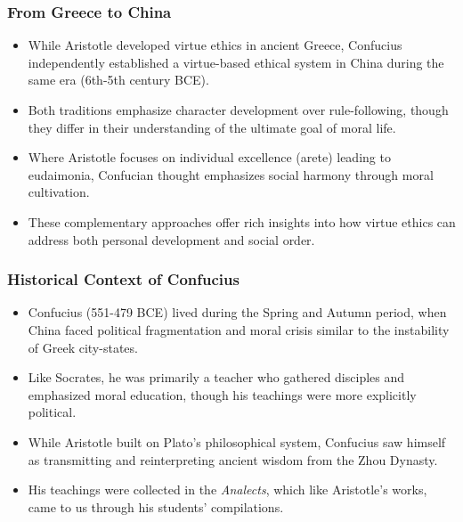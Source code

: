 \documentclass{beamer}
\begin{document}
\begin{frame}
    \frametitle{From Greece to China}
    \begin{itemize}
        \item While Aristotle developed virtue ethics in ancient Greece, Confucius independently established a virtue-based ethical system in China during the same era (6th-5th century BCE).
        
        \item Both traditions emphasize character development over rule-following, though they differ in their understanding of the ultimate goal of moral life.
        
        \item Where Aristotle focuses on individual excellence (arete) leading to eudaimonia, Confucian thought emphasizes social harmony through moral cultivation.
        
        \item These complementary approaches offer rich insights into how virtue ethics can address both personal development and social order.
    \end{itemize}
\end{frame}

\begin{frame}
    \frametitle{Historical Context of Confucius}
    \begin{itemize}
        \item Confucius (551-479 BCE) lived during the Spring and Autumn period, when China faced political fragmentation and moral crisis similar to the instability of Greek city-states.
        
        \item Like Socrates, he was primarily a teacher who gathered disciples and emphasized moral education, though his teachings were more explicitly political.
        
        \item While Aristotle built on Plato's philosophical system, Confucius saw himself as transmitting and reinterpreting ancient wisdom from the Zhou Dynasty.
        
        \item His teachings were collected in the \textit{Analects}, which like Aristotle's works, came to us through his students' compilations.
    \end{itemize}
\end{frame}
\end{document}
